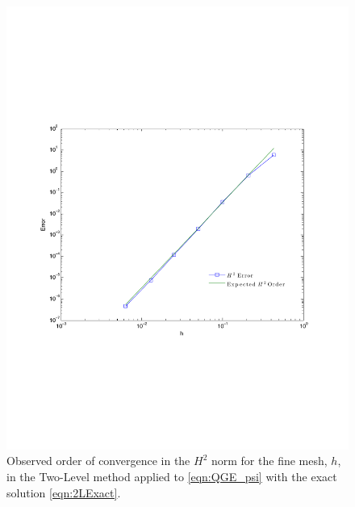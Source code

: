 \begin{figure}
  \begin{center}
    \includegraphics[scale=0.6]{Figures/fineConvergence.pdf}
    \caption{Observed order of convergence in the $H^2$ norm for the fine mesh,
      $h$, in the Two-Level method applied to \eqref{eqn:QGE_psi} with the exact
      solution \eqref{eqn:2LExact}.}
  \label{fig:TwoLevelh}
  \end{center}
\end{figure}
